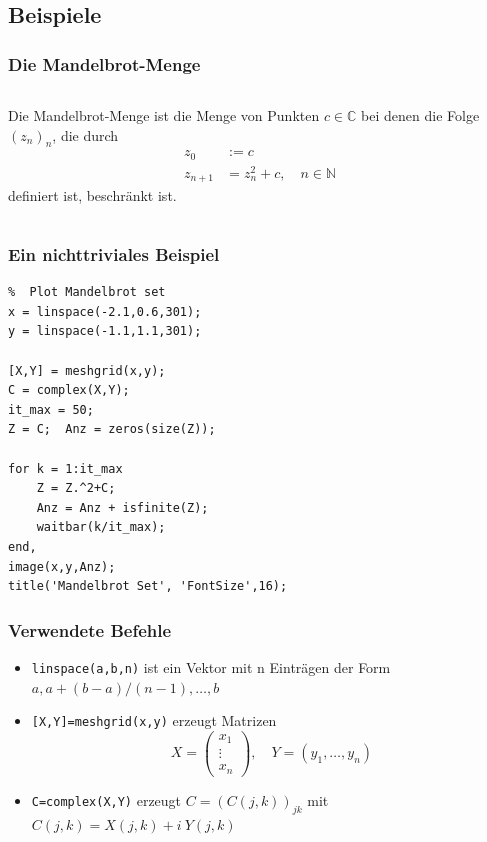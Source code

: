\subsection{Beispiele}
\begin{frame}[fragile]\frametitle{Die Mandelbrot-Menge}
\begin{columns}[c,onlytextwidth]

Die Mandelbrot-Menge ist die Menge von Punkten $c \in \mathbb{C}$
bei denen die Folge $(z_n)_n$, die durch
\begin{align*} 
z_0&:=c\\
z_{n+1} &= z_n^2 +c, \quad n \in \mathbb{N} 
\end{align*}
definiert ist, beschränkt ist.
\end{columns}
\end{frame}
\begin{frame}[fragile]\frametitle{Ein nichttriviales Beispiel}
\begin{lstlisting}
%  Plot Mandelbrot set
x = linspace(-2.1,0.6,301);
y = linspace(-1.1,1.1,301);

[X,Y] = meshgrid(x,y);
C = complex(X,Y);
it_max = 50;
Z = C;  Anz = zeros(size(Z));

for k = 1:it_max
    Z = Z.^2+C;
    Anz = Anz + isfinite(Z);
    waitbar(k/it_max);
end,
image(x,y,Anz);
title('Mandelbrot Set', 'FontSize',16);
\end{lstlisting}
\end{frame}
\begin{frame}[fragile]\frametitle{Verwendete Befehle}
\begin{itemize}
\item \lstinline!linspace(a,b,n)! ist ein Vektor mit n Einträgen der Form
$a, a+(b-a)/(n-1), \dots ,b$
\item \lstinline![X,Y]=meshgrid(x,y)! erzeugt Matrizen 
\begin{equation*}
X = \left( \begin{array}{c} x_1 \\ \vdots \\x_n \end{array}
\right), \quad Y=( y_1, \dots ,y_n) 
\end{equation*}
\item \lstinline!C=complex(X,Y)! erzeugt $C=(C(j,k))_{jk}$ mit
$C(j,k)=X(j,k)+i \ Y(j,k)$ 
\end{itemize}
\end{frame}
